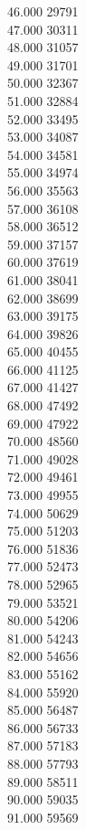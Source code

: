 { 46.000	29791 \\
 47.000	30311 \\
 48.000	31057 \\
 49.000	31701 \\
 50.000	32367 \\
 51.000	32884 \\
 52.000	33495 \\
 53.000	34087 \\
 54.000	34581 \\
 55.000	34974 \\
 56.000	35563 \\
 57.000	36108 \\
 58.000	36512 \\
 59.000	37157 \\
 60.000	37619 \\
 61.000	38041 \\
 62.000	38699 \\
 63.000	39175 \\
 64.000	39826 \\
 65.000	40455 \\
 66.000	41125 \\
 67.000	41427 \\
 68.000	47492 \\
 69.000	47922 \\
 70.000	48560 \\
 71.000	49028 \\
 72.000	49461 \\
 73.000	49955 \\
 74.000	50629 \\
 75.000	51203 \\
 76.000	51836 \\
 77.000	52473 \\
 78.000	52965 \\
 79.000	53521 \\
 80.000	54206 \\
 81.000	54243 \\
 82.000	54656 \\
 83.000	55162 \\
 84.000	55920 \\
 85.000	56487 \\
 86.000	56733 \\
 87.000	57183 \\
 88.000	57793 \\
 89.000	58511 \\
 90.000	59035 \\
 91.000	59569 \\
}
